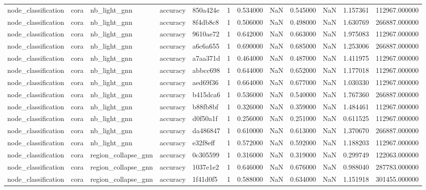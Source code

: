 \begin{tabular}{lllllrrrrrrr}
node_classification & cora & nb_light_gnn & accuracy & 850a424e & 1 & 0.534000 & NaN & 0.545000 & NaN & 1.157361 & 112967.000000 \\
node_classification & cora & nb_light_gnn & accuracy & 8f4db8c8 & 1 & 0.506000 & NaN & 0.498000 & NaN & 1.630769 & 266887.000000 \\
node_classification & cora & nb_light_gnn & accuracy & 9610ae72 & 1 & 0.642000 & NaN & 0.663000 & NaN & 1.975083 & 112967.000000 \\
node_classification & cora & nb_light_gnn & accuracy & a6c6a655 & 1 & 0.690000 & NaN & 0.685000 & NaN & 1.253006 & 266887.000000 \\
node_classification & cora & nb_light_gnn & accuracy & a7aa371d & 1 & 0.464000 & NaN & 0.487000 & NaN & 1.411975 & 112967.000000 \\
node_classification & cora & nb_light_gnn & accuracy & abbcc698 & 1 & 0.644000 & NaN & 0.652000 & NaN & 1.177018 & 112967.000000 \\
node_classification & cora & nb_light_gnn & accuracy & aed69f36 & 1 & 0.664000 & NaN & 0.677000 & NaN & 1.030330 & 112967.000000 \\
node_classification & cora & nb_light_gnn & accuracy & b415dca6 & 1 & 0.536000 & NaN & 0.540000 & NaN & 1.767360 & 266887.000000 \\
node_classification & cora & nb_light_gnn & accuracy & b88fb8bf & 1 & 0.326000 & NaN & 0.359000 & NaN & 1.484461 & 112967.000000 \\
node_classification & cora & nb_light_gnn & accuracy & d0f50a1f & 1 & 0.256000 & NaN & 0.251000 & NaN & 0.611525 & 112967.000000 \\
node_classification & cora & nb_light_gnn & accuracy & da486847 & 1 & 0.610000 & NaN & 0.613000 & NaN & 1.370670 & 266887.000000 \\
node_classification & cora & nb_light_gnn & accuracy & e32f8eff & 1 & 0.572000 & NaN & 0.592000 & NaN & 1.188203 & 112967.000000 \\
node_classification & cora & region_collapse_gnn & accuracy & 0c305599 & 1 & 0.316000 & NaN & 0.319000 & NaN & 0.299749 & 122063.000000 \\
node_classification & cora & region_collapse_gnn & accuracy & 1037e1e2 & 1 & 0.646000 & NaN & 0.676000 & NaN & 0.988040 & 287783.000000 \\
node_classification & cora & region_collapse_gnn & accuracy & 1f41d0f5 & 1 & 0.588000 & NaN & 0.634000 & NaN & 1.151918 & 301455.000000 \\

\end{tabular}
